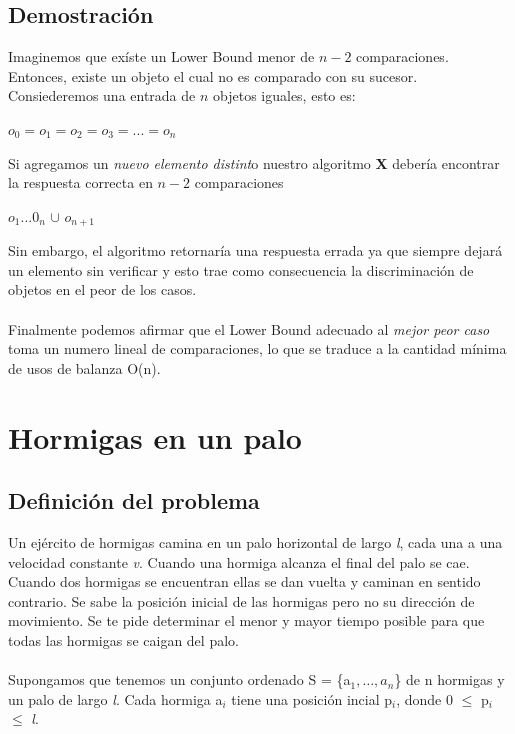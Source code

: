 \documentclass[11pt,spanish]{article}
\begin{document}
\subsection{Demostración}
Imaginemos que exíste un Lower Bound menor de $n-2$ comparaciones. Entonces, existe un objeto el cual no es comparado con su sucesor.\\Consiederemos una entrada de $n$ objetos iguales, esto es: 
\begin{center}$o_0 = o_1 = o_2 = o_3 = ... = o_n$\end{center}
Si agregamos un \emph{nuevo elemento distint}o nuestro algoritmo \textbf{X }debería encontrar la respuesta correcta en $n-2$ comparaciones\\
\begin{center}$o_1...0_n$ $\cup$ $o_{n+1}$\end{center}
Sin embargo, el algoritmo retornaría una respuesta errada ya que siempre dejará un elemento sin verificar y esto trae como consecuencia la discriminación de objetos en el peor de los casos.\\\\Finalmente podemos afirmar que el Lower Bound adecuado al \emph{mejor peor caso} toma un numero lineal de comparaciones, lo que se traduce a la cantidad mínima de usos de balanza O(n).

\section{Hormigas en un palo}
\subsection{Definición del problema}
Un ejército de hormigas camina en un palo horizontal de largo \emph{l}, cada una a una velocidad constante \emph{v}. Cuando una hormiga alcanza el final del palo se cae. Cuando dos hormigas se encuentran ellas se dan vuelta y caminan en sentido contrario. Se sabe la posición inicial de las hormigas pero no su dirección de movimiento. Se te pide determinar el menor y mayor tiempo posible para que todas las hormigas se caigan del palo.\\\\Supongamos que tenemos un conjunto ordenado S = \{a$_{1}, \dots ,a_{n}$\} de n hormigas y un palo de largo \emph{l}. Cada hormiga a$_{i}$ tiene una posición incial p$_{i}$, donde 0 $\leq $ p$_{i}$ $\leq $ \emph{l}.
\end{document}
